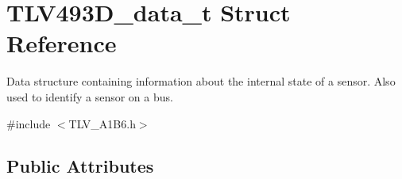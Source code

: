 \hypertarget{struct_t_l_v493_d__data__t}{}\section{T\+L\+V493\+D\+\_\+data\+\_\+t Struct Reference}
\label{struct_t_l_v493_d__data__t}


Data structure containing information about the internal state of a sensor. Also used to identify a sensor on a bus.  




{\ttfamily \#include $<$T\+L\+V\+\_\+\+A1\+B6.\+h$>$}

\subsection*{Public Attributes}
